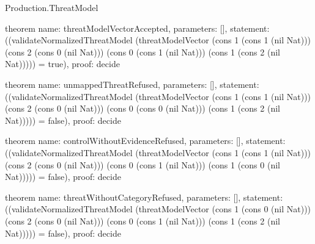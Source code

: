 \begin{lexlean}{Production.ThreatModel}
\begin{semanticmodule}
theorem{
  name: threatModelVectorAccepted,
  parameters: [],
  statement: ((validateNormalizedThreatModel (threatModelVector (cons 1 (cons 1 (nil Nat))) (cons 2 (cons 0 (nil Nat))) (cons 0 (cons 1 (nil Nat))) (cons 1 (cons 2 (nil Nat))))) = true),
  proof: decide{}
}

theorem{
  name: unmappedThreatRefused,
  parameters: [],
  statement: ((validateNormalizedThreatModel (threatModelVector (cons 1 (cons 1 (nil Nat))) (cons 2 (cons 0 (nil Nat))) (cons 0 (cons 0 (nil Nat))) (cons 1 (cons 2 (nil Nat))))) = false),
  proof: decide{}
}

theorem{
  name: controlWithoutEvidenceRefused,
  parameters: [],
  statement: ((validateNormalizedThreatModel (threatModelVector (cons 1 (cons 1 (nil Nat))) (cons 2 (cons 0 (nil Nat))) (cons 0 (cons 1 (nil Nat))) (cons 1 (cons 0 (nil Nat))))) = false),
  proof: decide{}
}

theorem{
  name: threatWithoutCategoryRefused,
  parameters: [],
  statement: ((validateNormalizedThreatModel (threatModelVector (cons 1 (cons 0 (nil Nat))) (cons 2 (cons 0 (nil Nat))) (cons 0 (cons 1 (nil Nat))) (cons 1 (cons 2 (nil Nat))))) = false),
  proof: decide{}
}
\end{semanticmodule}
\end{lexlean}
